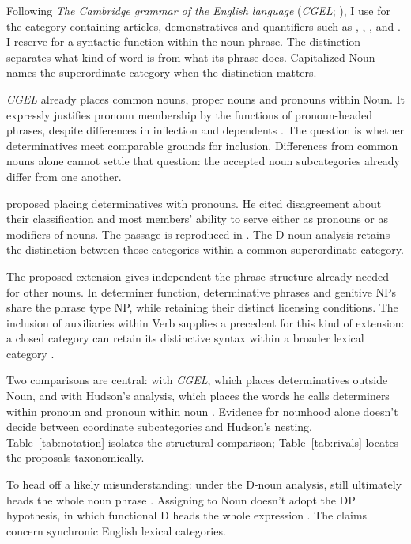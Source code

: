 \documentclass[12pt]{article}
\begin{document}
Following \textit{The Cambridge grammar of the English language} (\textit{CGEL}; \citealt{huddleston2002}), I use  for the category containing articles, demonstratives and quantifiers such as , , ,  and . I reserve  for a syntactic function within the noun phrase. The distinction separates what kind of word  is from what its phrase does. Capitalized Noun names the superordinate category when the distinction matters.

\textit{CGEL} already places common nouns, proper nouns and pronouns within Noun. It expressly justifies pronoun membership by the functions of pronoun-headed phrases, despite differences in inflection and dependents \citep[327--328]{huddleston2002}. The question is whether determinatives meet comparable grounds for inclusion. Differences from common nouns alone cannot settle that question: the accepted noun subcategories already differ from one another.

\textcite[24]{palmer1924} proposed placing determinatives with pronouns. He cited disagreement about their classification and most members' ability to serve either as pronouns or as modifiers of nouns. The passage is reproduced in \textcite[3]{reynolds2013determiners}. The D-noun analysis retains the distinction between those categories within a common superordinate category.

The proposed extension gives independent  the phrase structure already needed for other nouns. In determiner function, determinative phrases and genitive NPs share the phrase type NP, while retaining their distinct licensing conditions. The inclusion of auxiliaries within Verb supplies a precedent for this kind of extension: a closed category can retain its distinctive syntax within a broader lexical category \citep{pullumwilson1977}.

Two comparisons are central: with \textit{CGEL}, which places determinatives outside Noun, and with Hudson's analysis, which places the words he calls determiners within pronoun and pronoun within noun \citep{hudson2004determiners,hudson2010wordgrammar}. Evidence for nounhood alone doesn't decide between coordinate subcategories and Hudson's nesting. Table~\ref{tab:notation} isolates the structural comparison; Table~\ref{tab:rivals} locates the proposals taxonomically.

To head off a likely misunderstanding: under the D-noun analysis,  still ultimately heads the whole noun phrase . Assigning  to Noun doesn't adopt the DP hypothesis, in which functional D heads the whole expression \citep{abney1987}. The claims concern synchronic English lexical categories.
\end{document}

